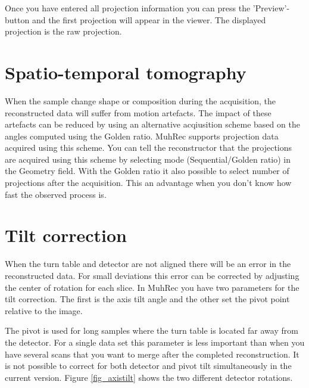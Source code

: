 \documentclass[a4paper]{scrreprt}
\begin{document}
Once you have entered all projection information you can press the
'Preview'-button and the first projection will appear in the viewer. The
displayed projection is the raw projection.

\section{Spatio-temporal tomography}
When the sample change shape or composition during the acquisition, the reconstructed data will suffer from motion artefacts. The impact of these artefacts can be reduced by using an alternative acqiusition scheme based on the angles computed using the Golden ratio. MuhRec supports projection data acquired using this scheme. You can tell the reconstructor that the projections are acquired using this scheme by selecting mode (Sequential/Golden ratio) in the Geometry field. With the Golden ratio it also possible to select number of projections after the acquisition. This an advantage when you don't know how fast the observed process is\cite{kaestner2011_golden}. 


\section{Tilt correction}
When the turn table and detector are not aligned there will be an error in the
reconstructed data. For small deviations this error can be corrected by
adjusting the center of rotation for each slice. In MuhRec you have two
parameters for the tilt correction. The first is the axis tilt angle and the
other set the pivot point relative to the image.


The pivot is used for long samples where the turn table is located far away from
the detector. For a single data set this parameter is less important than when
you have several scans that you want to merge after the completed
reconstruction. It is not possible to correct for both detector and pivot tilt
simultaneously in the current version. Figure \ref{fig_axistilt} shows the two
different detector rotations.
\end{document}
